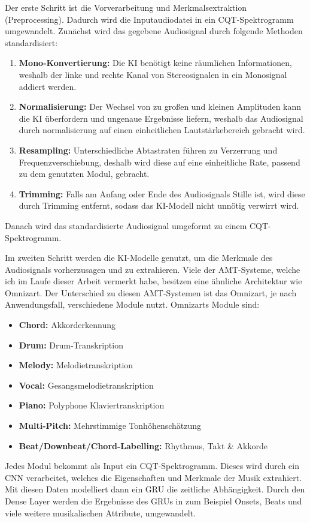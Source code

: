 Der erste Schritt ist die Vorverarbeitung und Merkmalsextraktion (Preprocessing).
Dadurch wird die Inputaudiodatei in ein CQT-Spektrogramm umgewandelt.
Zunächst wird das gegebene Audiosignal durch folgende Methoden standardisiert:
\begin{enumerate}
    \item \textbf{Mono-Konvertierung:} Die KI benötigt keine räumlichen Informationen, weshalb der linke und rechte Kanal von Stereosignalen in ein Monosignal addiert werden.
    \item \textbf{Normalisierung:} Der Wechsel von zu großen und kleinen Amplituden kann die KI überfordern und ungenaue Ergebnisse liefern, weshalb das Audiosignal durch normalisierung auf einen einheitlichen Lautstärkebereich gebracht wird.
    \item \textbf{Resampling:} Unterschiedliche Abtastraten führen zu Verzerrung und Frequenzverschiebung, deshalb wird diese auf eine einheitliche Rate, passend zu dem genutzten Modul, gebracht.
    \item \textbf{Trimming:} Falls am Anfang oder Ende des Audiosignals Stille ist, wird diese durch Trimming entfernt, sodass das KI-Modell nicht unnötig verwirrt wird.
\end{enumerate}
Danach wird das standardisierte Audiosignal umgeformt zu einem CQT-Spektrogramm.

Im zweiten Schritt werden die KI-Modelle genutzt, um die Merkmale des Audiosignals vorherzusagen und zu extrahieren.
Viele der AMT-Systeme, welche ich im Laufe dieser Arbeit vermerkt habe, besitzen eine ähnliche Architektur wie Omnizart.
\cite{hawthorne2017onsets}
Der Unterschied zu diesen AMT-Systemen ist das Omnizart, je nach Anwendungsfall, verschiedene Module nutzt.
Omnizarts Module sind:
\begin{itemize}
    \item \textbf{Chord:} Akkorderkennung
    \item \textbf{Drum:} Drum-Transkription
    \item \textbf{Melody:} Melodietranskription
    \item \textbf{Vocal:} Gesangsmelodietranskription
    \item \textbf{Piano:} Polyphone Klaviertranskription
    \item \textbf{Multi-Pitch:} Mehrstimmige Tonhöhenschätzung
    \item \textbf{Beat/Downbeat/Chord-Labelling:} Rhythmus, Takt \& Akkorde
\end{itemize}
Jedes Modul bekommt als Input ein CQT-Spektrogramm.
Dieses wird durch ein CNN verarbeitet, welches die Eigenschaften und Merkmale der Musik extrahiert.
Mit diesen Daten modelliert dann ein GRU die zeitliche Abhängigkeit.
Durch den Dense Layer werden die Ergebnisse des GRUs in zum Beispiel Onsets,
Beats und viele weitere musikalischen Attribute, umgewandelt.

